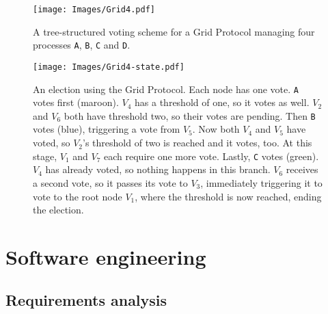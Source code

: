 \documentclass[11pt,chapterprefix=true,toc=bibliography,numbers=noendperiod,
               footnotes=multiple,twoside]{scrreprt}
\begin{document}
\begin{figure}[h]
    \centering
    \texttt{[image: Images/Grid4.pdf]}
    \caption[Tree-structured voting scheme for a Grid Protocol]{A tree-structured voting scheme for a Grid Protocol managing four processes \texttt{A}, \texttt{B}, \texttt{C} and \texttt{D}.}
    \label{fig:grid4}
\end{figure}

\begin{figure}[p]
    \centering
    \texttt{[image: Images/Grid4-state.pdf]}
    \caption[An election using the Grid Protocol]{An election using the Grid Protocol. Each node has one vote. \texttt{A} votes first (maroon). \(V_4\) has a threshold of one, so it votes as well. \(V_2\) and \(V_6\) both have threshold two, so their votes are pending. Then \texttt{B} votes (blue), triggering a vote from \(V_5\). Now both \(V_4\) and \(V_5\) have voted, so \(V_2\)'s threshold of two is reached and it votes, too. At this stage, \(V_1\) and \(V_7\) each require one more vote. Lastly, \texttt{C} votes (green). \(V_4\) has already voted, so nothing happens in this branch. \(V_6\) receives a second vote, so it passes its vote to \(V_3\), immediately triggering it to vote to the root node \(V_1\), where the threshold is now reached, ending the election.}
    \label{fig:grid4-state}
\end{figure}

\section{Software engineering\label{sc:software-engineering}}

\subsection{Requirements analysis\label{sc:requirements-analysis}}
\end{document}
